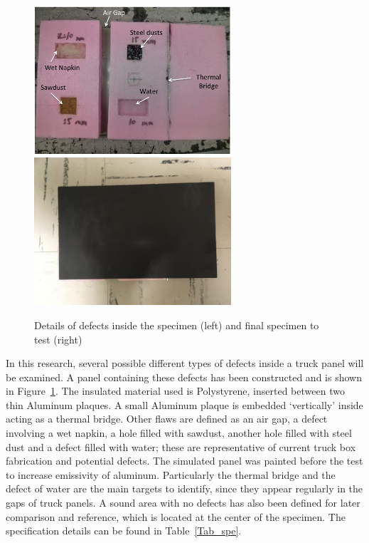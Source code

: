 \documentclass{tQRT2e}
\begin{document}
\begin{figure}
	\includegraphics[width=7.33cm, height=5.5cm]{Panel_detail}
	\includegraphics[width=7.33cm, height=5.5cm]{Panel_done}
	\caption{Details of defects inside the specimen (left) and final specimen to test (right) }
	\label{panel}
\end{figure}
\indent \indent In this research, several possible different types of defects inside a truck panel will be examined.  A panel containing these defects has been constructed and is shown in Figure~\ref{panel}. The insulated material used is Polystyrene, inserted between two thin Aluminum plaques. A small Aluminum plaque is embedded ‘vertically’ inside acting as a thermal bridge. Other flaws are defined as an air gap, a defect involving a wet napkin, a hole filled with sawdust, another hole filled with steel dust and a defect filled with water; these are representative of current truck box fabrication and potential defects. The simulated panel was painted before the test to increase emissivity of aluminum. Particularly the thermal bridge and the defect of water are the main targets to identify, since they appear regularly in the gaps of truck panels. A sound area with no defects has also been defined for later comparison and reference, which is located at the center of the specimen. The specification details can be found in Table~\ref{Tab_spe}.
\end{document}
